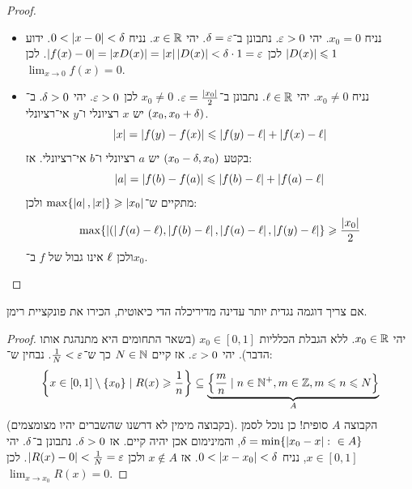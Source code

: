 \documentclass[name=רשימות חשבון דיפרנציאלי ואינטגרלי 1א]{../../../tex/classes/megasumPreamble}
\begin{document}
	\begin{proof}\,
		\begin{itemize}
			\item[$\implies$]נניח $x_0 = 0$. יהי $\eg > 0$. נתבונן ב־$\dg = \eg$. יהי $x \in \mathbb{R}$. נניח $0 < \left \lvert x - 0 \right \rvert < \delta$. ידוע $\left \lvert D(x) \right \rvert \leqslant 1$ לכן $\sof{f(x) - 0} = \sof{xD(x)} = \sof{x}\sof{D(x)} < \dg \cdot 1 = \eg$. לכן $\lim_{x \to 0} f(x) = 0$.
			\item[$\impliedby$]נניח $x_0 \neq 0$. יהי $\ell \in \mathbb{R}$. נתבונן ב־$\eg = \frac{\sof{x_0}}{2}$. $x_0 \neq 0$ לכן $\eg > 0$. יהי $\delta > 0$. ב־$(x_0, x_0 + \delta)$ יש $x$ רציונלי ו־$y$ אי־רציונלי.
			\[ \left \lvert x \right \rvert = \left \lvert f(y) - f(x) \right \rvert \leqslant \left \lvert f(y) - \ell \right \rvert + \left \lvert f(x) - \ell \right \rvert \]
			בקטע $(x_0 - \delta, x_0)$ יש $a$ רציונלי ו־$b$ אי־רציונלי. אז:
			\[ \left \lvert a \right \rvert = \left \lvert f(b) - f(a) \right \rvert \leqslant \left \lvert f(b) - \ell \right \rvert + \left \lvert f(a) - \ell \right \rvert \]
			מתקיים ש־$\max\{\left \lvert a \right \rvert, \left \lvert x \right \rvert\} \geqslant \left \lvert x_0 \right \rvert$ ולכן:
			\[ \max\{\left \lvert ( \right \rvert f(a) - \ell), \left \lvert f(b) - \ell \right \rvert, \left \lvert f(a) - \ell \right \rvert, \left \lvert f(y) - \ell \right \rvert\} \geqslant \frac{\left \lvert x_0 \right \rvert}{2} \]
			ולכן $\ell$ אינו גבול של $f$ ב־$x_0$.
		\end{itemize}\envendproof
	\end{proof}

	אם צריך דוגמה נגדית יותר עדינה מדיריכלה הדי כיאוטית, הכירו את פונקציית רימן.
	\begin{proof}
		יהי $x_0 \in \mathbb{R}$. ללא הגבלת הכלליות $x_0 \in [0, 1]$ (בשאר התחומים היא מתנהגת אותו הדבר). יהי $\eg > 0$. אז קיים $N \in\mathbb{N}$ כך ש־$\frac{1}{N} < \eg$. נבחין ש־:
		\[ \left \{ x \in [0, 1] \setminus \{x_0\} \mid R(x) \geqslant \frac{1}{n} \right \} \subseteq \underbrace{\left \{ \frac{m}{n} \mid n \in \mathbb{N}^{+}, m \in \mathbb{Z}, m \leqslant n \leqslant N \right \}}_{A} \]
		(בקבוצה מימין לא דרשנו שהשברים יהיו מצומצמים). הקבוצה $A$ סופית! כן נוכל לסמן $\delta = \min\{\left \lvert x_0 - x \right \rvert \colon  \in A\}$, והמינימום אכן יהיה קיים. אז $\delta > 0$. נתבונן ב־$\delta$. יהי $x \in [0, 1]$, נניח $0 < \left \lvert x - x_0 \right \rvert < \delta$. אז $x \notin A$ ולכן $\sof{R(x) - 0} < \frac{1}{N} = \eg$. לכן $\lim_{x \to x_0} R(x) = 0$.
	\end{proof}
\end{document}
